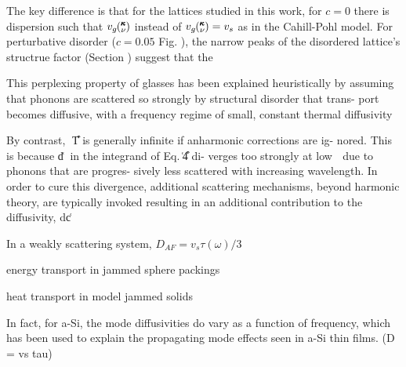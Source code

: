 \documentclass[aps,prb,twocolumn,superscriptaddress,amsmath,amssymb,floatfix]{revtex4}
\newcommand{\kv}{\mspace{-4.0mu}\left(\mspace{-8.0mu}
\begin{smallmatrix}&\pmb{\kappa} \\&\nu\end{smallmatrix}
\mspace{-3.0mu}\right)}
\begin{document}
The key difference is that for the lattices studied in this work, 
for $c=0$ there is dispersion such that $v_g\kv$ instead of 
$v_g\kv = v_s$ as in the Cahill-Pohl model. For perturbative 
disorder ($c=0.05$ Fig. ), the narrow peaks of the disordered 
lattice's structrue factor (Section ) suggest that the

This perplexing property of glasses
has been explained heuristically by assuming that phonons
are scattered so strongly by structural disorder that trans-
port becomes diffusive, with a frequency regime of small,
constant thermal diffusivity 
\cite{kittel_interpretation_1949,sheng_heat_1991}

By contrast,
␬͑T͒ is generally infinite if anharmonic corrections are ig-
nored. This is because d͑␻͒ in the integrand of Eq. ͑4͒ di-
verges too strongly at low ␻ due to phonons that are progres-
sively less scattered with increasing wavelength.
\cite{vitelli_heat_2010} 
In order to cure this divergence, additional scattering
mechanisms, beyond harmonic theory, are typically invoked
resulting in an additional contribution to the diffusivity,
dc͑␻͒






In a weakly scattering system, $D_{AF} = v_s \tau(\omega)/3$
\cite{xu_energy_2009}

energy transport in jammed sphere packings\cite{xu_energy_2009}

heat transport in model jammed solids\cite{vitelli_heat_2010}

In fact, for a-Si, the mode diffusivities do vary as a function 
of frequency,
\cite{feldman_thermal_1993,feldman_numerical_1999,allen_diffusons_1999} 
which has been used to explain the propagating 
mode effects seen in a-Si thin films. (D = vs tau)
\cite{he_heat_2011}
\end{document}
